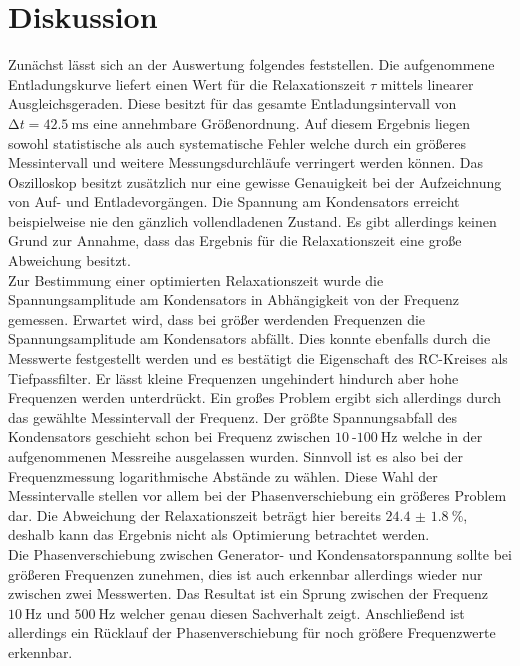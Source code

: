 \section{Diskussion}

Zunächst lässt sich an der Auswertung folgendes feststellen. Die aufgenommene Entladungskurve liefert einen Wert für die 
Relaxationszeit $\tau$ mittels linearer Ausgleichsgeraden. Diese besitzt für das gesamte Entladungsintervall von $\increment t = \SI{42.5}{\milli\second}$ eine annehmbare
Größenordnung. Auf diesem Ergebnis liegen sowohl statistische als auch systematische Fehler welche durch ein größeres Messintervall und weitere Messungsdurchläufe verringert werden 
können. Das Oszilloskop besitzt zusätzlich nur eine gewisse Genauigkeit bei der Aufzeichnung von Auf- und Entladevorgängen. Die Spannung am Kondensators erreicht beispielweise 
nie den gänzlich vollendladenen Zustand.
Es gibt allerdings keinen Grund zur Annahme, dass das Ergebnis für die Relaxationszeit eine große Abweichung besitzt.
\\
\newline
Zur Bestimmung einer optimierten Relaxationszeit wurde die Spannungsamplitude am Kondensators in Abhängigkeit von der Frequenz gemessen. 
Erwartet wird, dass bei größer werdenden Frequenzen die Spannungsamplitude am Kondensators abfällt.
Dies konnte ebenfalls durch die Messwerte festgestellt werden und es bestätigt die Eigenschaft des 
RC-Kreises als Tiefpassfilter. Er lässt kleine Frequenzen ungehindert hindurch aber hohe Frequenzen werden unterdrückt.
Ein großes Problem ergibt sich allerdings durch das gewählte Messintervall der Frequenz.
Der größte Spannungsabfall des Kondensators geschieht schon bei Frequenz zwischen $\SI{10}{}$-$\SI{100}{\hertz}$ welche in der aufgenommenen Messreihe ausgelassen wurden.
Sinnvoll ist es also bei der Frequenzmessung logarithmische Abstände zu wählen. Diese Wahl der Messintervalle stellen vor allem bei der Phasenverschiebung ein größeres Problem dar.
Die Abweichung der Relaxationszeit beträgt hier bereits $\SI{24.4(18)}{\percent}$, deshalb kann das Ergebnis nicht als Optimierung betrachtet werden.
\\
\newline
Die Phasenverschiebung zwischen Generator- und Kondensatorspannung sollte bei größeren Frequenzen zunehmen, dies ist auch erkennbar allerdings
wieder nur zwischen zwei Messwerten.
Das Resultat ist ein Sprung zwischen der Frequenz $\SI{10}{\hertz}$ 
und $\SI{500}{\hertz}$ welcher genau diesen Sachverhalt zeigt. Anschließend ist allerdings ein Rücklauf der Phasenverschiebung für noch größere Frequenzwerte erkennbar.
